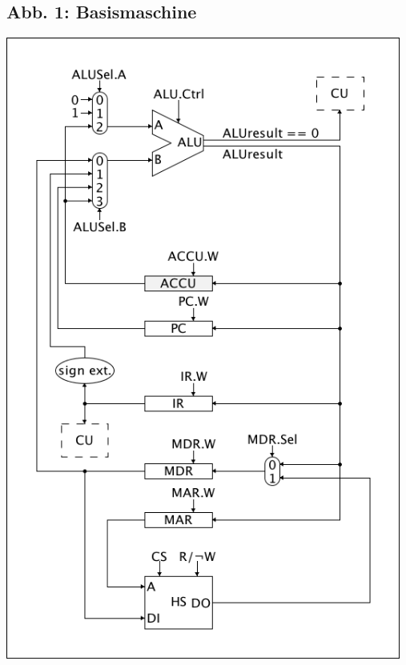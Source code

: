 \documentclass[12pt,titlepage]{article}
\begin{document}
\subsection{Abb. 1: Basismaschine}
\includegraphics[width=13cm]{schematics.png}
\end{document}

